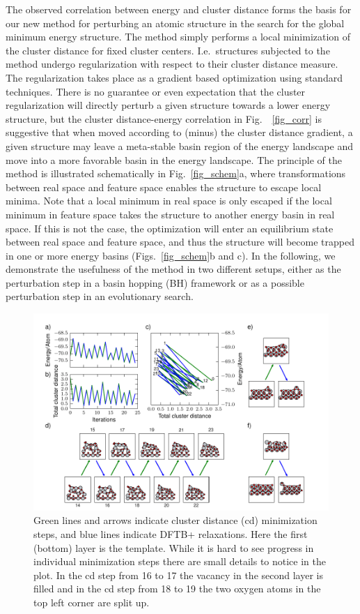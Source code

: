 \documentclass[aip,amsmath,amssymb,reprint]{revtex4-1}
\begin{document}
The observed correlation between energy and cluster distance forms the
basis for our new method for perturbing an atomic structure in the
search for the global minimum energy structure. The method simply
performs a local minimization of the cluster distance for fixed
cluster centers. I.e.\ structures subjected to the method undergo
regularization with respect to their cluster distance measure. The
regularization takes place as a gradient based optimization using
standard techniques. There is no guarantee or even expectation that the
cluster regularization will directly perturb a given structure towards
a lower energy structure, but the cluster distance-energy correlation
in Fig.\ \ \ref{fig_corr} is suggestive that when moved according to (minus) the cluster distance gradient, a given structure may leave a meta-stable basin
region of the energy landscape and move into a more favorable
basin in the energy landscape. The principle of the method is illustrated
schematically in Fig.\  \ref{fig_schem}a, where transformations between real space and feature space enables the structure to escape local minima. Note that a local minimum in real space is only escaped if the local minimum in feature space takes the structure to another energy basin in real space. If this is not the case, the optimization will enter an equilibrium state between real space and feature space, and thus the structure will become trapped in one or more energy basins (Figs.\  \ref{fig_schem}b and c). In the following, we demonstrate the usefulness of
the method in two different setups,
either as the perturbation step in a basin hopping (BH) framework or as a
possible perturbation step in an evolutionary search.

\begin{figure}[tb]
    \centering
    \includegraphics[width=2.0\columnwidth]{fig6-minimize.pdf}
    \caption{Green lines and arrows indicate cluster distance (cd) minimization steps, and blue lines indicate DFTB+ relaxations. Here the first (bottom) layer is the template. While it is hard to see progress in individual minimization steps there are small details to notice in the plot. In the cd step from 16 to 17 the vacancy in the second layer is filled and in the cd step from 18 to 19 the two oxygen atoms in the top left corner are split up.}
    \label{fig_min}
\end{figure}
\end{document}
